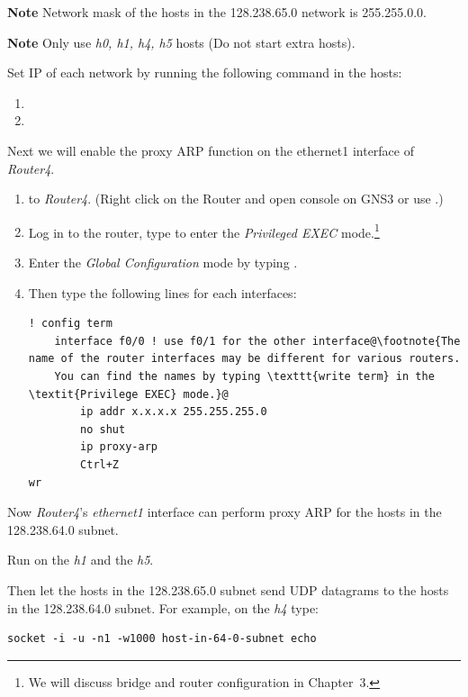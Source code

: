 \documentclass{../UTNetLab}
\begin{document}
\textbf{Note}\quad
Network mask of the hosts in the 128.238.65.0 network is 255.255.0.0.

\textbf{Note}\quad
Only use \textit{h0, h1, h4, h5} hosts (Do not start extra hosts).

Set IP of each network by running the following command in the hosts:
\begin{enumerate}
    \item {}
    \item {}
\end{enumerate}
Next we will enable the proxy ARP function on the ethernet1 interface of \textit{Router4}.
\begin{enumerate}
    \item {} to \textit{Router4}.
          (Right click on the Router and open console on GNS3 or use .)
    \item Log in to the router, type  to enter the \textit{Privileged EXEC} mode.\footnote{We will discuss bridge and router configuration in Chapter~3.}
    \item Enter the \textit{Global Configuration} mode by typing .
    \item Then type the following lines for each interfaces:
          \begin{lstlisting}[language={cisco}, escapechar={@}, emph={x}]
! config term
    interface f0/0 ! use f0/1 for the other interface@\footnote{The name of the router interfaces may be different for various routers.
    You can find the names by typing \texttt{write term} in the \textit{Privilege EXEC} mode.}@
        ip addr x.x.x.x 255.255.255.0
        no shut
        ip proxy-arp
        Ctrl+Z
wr
        \end{lstlisting}
\end{enumerate}

Now \textit{Router4}’s \textit{ethernet1} interface can perform proxy ARP for the hosts in the 128.238.64.0 subnet.

Run  on the \textit{h1} and the \textit{h5}.

Then let the hosts in the 128.238.65.0 subnet send UDP datagrams to the hosts in the 128.238.64.0 subnet.
For example, on the \textit{h4} type:
\begin{lstlisting}[emph={host-in-64-0-subnet},morekeywords={[3]echo}]
socket -i -u -n1 -w1000 host-in-64-0-subnet echo
    \end{lstlisting}
\end{document}
